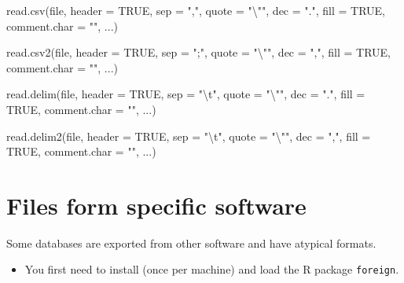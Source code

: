 \documentclass[
  letterpaper,
  DIV=11,
  numbers=noendperiod]{scrreprt}
\newenvironment{Shaded}{\begin{snugshade}}{\end{snugshade}}
\newcommand{\AttributeTok}[1]{\textcolor[rgb]{0.40,0.45,0.13}{#1}}
\newcommand{\ConstantTok}[1]{\textcolor[rgb]{0.56,0.35,0.01}{#1}}
\newcommand{\FunctionTok}[1]{\textcolor[rgb]{0.28,0.35,0.67}{#1}}
\newcommand{\NormalTok}[1]{\textcolor[rgb]{0.00,0.23,0.31}{#1}}
\newcommand{\SpecialCharTok}[1]{\textcolor[rgb]{0.37,0.37,0.37}{#1}}
\newcommand{\StringTok}[1]{\textcolor[rgb]{0.13,0.47,0.30}{#1}}
\providecommand{\tightlist}{%
  \setlength{\itemsep}{0pt}\setlength{\parskip}{0pt}}\usepackage{longtable,booktabs,array}
\begin{document}
\begin{Shaded}
\begin{Highlighting}[]
\FunctionTok{read.csv}\NormalTok{(file, }\AttributeTok{header =} \ConstantTok{TRUE}\NormalTok{, }\AttributeTok{sep =} \StringTok{","}\NormalTok{, }\AttributeTok{quote =} \StringTok{"}\SpecialCharTok{\textbackslash{}"}\StringTok{"}\NormalTok{,}
         \AttributeTok{dec =} \StringTok{"."}\NormalTok{, }\AttributeTok{fill =} \ConstantTok{TRUE}\NormalTok{, }\AttributeTok{comment.char =} \StringTok{""}\NormalTok{, ...)}

\FunctionTok{read.csv2}\NormalTok{(file, }\AttributeTok{header =} \ConstantTok{TRUE}\NormalTok{, }\AttributeTok{sep =} \StringTok{";"}\NormalTok{, }\AttributeTok{quote =} \StringTok{"}\SpecialCharTok{\textbackslash{}"}\StringTok{"}\NormalTok{,}
          \AttributeTok{dec =} \StringTok{","}\NormalTok{, }\AttributeTok{fill =} \ConstantTok{TRUE}\NormalTok{, }\AttributeTok{comment.char =} \StringTok{""}\NormalTok{, ...)}

\FunctionTok{read.delim}\NormalTok{(file, }\AttributeTok{header =} \ConstantTok{TRUE}\NormalTok{, }\AttributeTok{sep =} \StringTok{"}\SpecialCharTok{\textbackslash{}t}\StringTok{"}\NormalTok{, }\AttributeTok{quote =} \StringTok{"}\SpecialCharTok{\textbackslash{}"}\StringTok{"}\NormalTok{,}
           \AttributeTok{dec =} \StringTok{"."}\NormalTok{, }\AttributeTok{fill =} \ConstantTok{TRUE}\NormalTok{, }\AttributeTok{comment.char =} \StringTok{""}\NormalTok{, ...)}

\FunctionTok{read.delim2}\NormalTok{(file, }\AttributeTok{header =} \ConstantTok{TRUE}\NormalTok{, }\AttributeTok{sep =} \StringTok{"}\SpecialCharTok{\textbackslash{}t}\StringTok{"}\NormalTok{, }\AttributeTok{quote =} \StringTok{"}\SpecialCharTok{\textbackslash{}"}\StringTok{"}\NormalTok{,}
            \AttributeTok{dec =} \StringTok{","}\NormalTok{, }\AttributeTok{fill =} \ConstantTok{TRUE}\NormalTok{, }\AttributeTok{comment.char =} \StringTok{""}\NormalTok{, ...)}
\end{Highlighting}
\end{Shaded}

\section{Files form specific
software}\label{files-form-specific-software}

Some databases are exported from other software and have atypical
formats.

\begin{itemize}
\tightlist
\item
  You first need to install (once per machine) and load the R package
  \texttt{foreign}.
\end{itemize}
\end{document}
